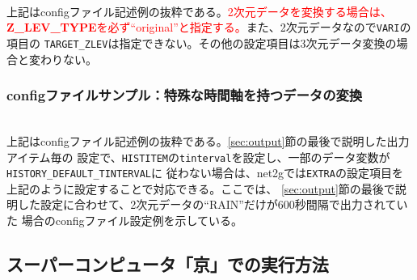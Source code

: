 \\

\noindent 上記はconfigファイル記述例の抜粋である。\textcolor{red}{2次元データを変換する場合は、
{\bf Z\_LEV\_TYPE}を必ず``original''と指定する。}また、2次元データなので\verb|VARI|の項目の
\verb|TARGET_ZLEV|は指定できない。その他の設定項目は3次元データ変換の場合と変わりない。


\subsubsection{configファイルサンプル：特殊な時間軸を持つデータの変換}

\\

\noindent 上記はconfigファイル記述例の抜粋である。\ref{sec:output}節の最後で説明した出力アイテム毎の
設定で、\verb|HISTITEM|の\verb|tinterval|を設定し、一部のデータ変数が\verb|HISTORY_DEFAULT_TINTERVAL|に
従わない場合は、net2gでは\verb|EXTRA|の設定項目を上記のように設定することで対応できる。ここでは、
\ref{sec:output}節の最後で説明した設定に合わせて、2次元データの``RAIN''だけが600秒間隔で出力されていた
場合のconfigファイル設定例を示している。


\subsection{スーパーコンピュータ「京」での実行方法}

